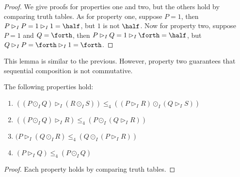 \begin{proof}
  We give proofs for properties one and two, but the others hold by
  comparing truth tables.  As for property one, suppose $P = 1$, then
  $P \rhd_I P = 1 \rhd_I 1 = \half$, but $1$ is not $\half$.  Now for
  property two, suppose $P = 1$ and $Q = \forth$, then $P \rhd_I Q = 1
  \rhd_I \forth = \half$, but $Q \rhd_I P = \forth \rhd_I 1 = \forth$.
\end{proof}
This lemma is similar to the previous.  However, property two
guarantees that sequential composition is not commutative.
\begin{lemma}
  \label{lemma:the_ideal_properties}
  The following properties hold:
  \begin{enumerate}
  \item $((P \odot_I Q) \rhd_I (R \odot_I S)) \leq_4 ((P \rhd_I R) \odot_I (Q \rhd_I S))$\\[-5px]
  \item $((P \odot_I Q) \rhd_I R) \leq_4 (P \odot_I (Q \rhd_I R))$\\[-5px]
  \item $(P \rhd_I (Q \odot_I R) \leq_4 (Q \odot_I (P \rhd_I R))$\\[-5px]
  \item $(P \rhd_I Q) \leq_4 (P \odot_I Q)$
  \end{enumerate}
\end{lemma}
\begin{proof}
  Each property holds by comparing truth tables.
\end{proof}

